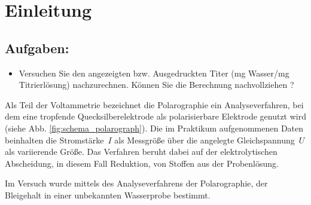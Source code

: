 
\section{Einleitung}
\label{sec:einleitung}

\subsection{Aufgaben:}
\begin{itemize}
	\item Versuchen Sie den angezeigten bzw. Ausgedruckten Titer (mg Wasser/mg Titrierlösung) nachzurechnen. Können Sie die Berechnung nachvollziehen ?
\end{itemize}






Als Teil der Voltammetrie bezeichnet die Polarographie ein Analyseverfahren, bei dem eine tropfende Quecksilberelektrode als polarisierbare Elektrode genutzt wird (siehe Abb. \ref{fig:schema_polarograph}). Die im Praktikum aufgenommenen Daten beinhalten die \mbox{Stromstärke $I$} als Messgröße über die angelegte \mbox{Gleichspannung $U$} als variierende Größe. Das Verfahren beruht dabei auf der elektrolytischen Abscheidung, in diesem Fall Reduktion, von Stoffen aus der Probenlösung.\cite{Brehm.2004}


Im Versuch wurde mittels des Analyseverfahrens der Polarographie, der Bleigehalt in einer unbekannten Wasserprobe bestimmt.